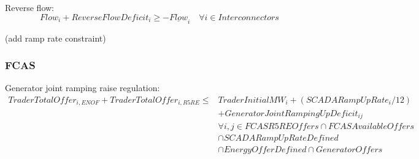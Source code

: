 \documentclass{article}
\begin{document}
Reverse flow:
\begin{equation}
Flow_{i} + ReverseFlowDeficit_{i} \geq - \underline{Flow}_{i} \quad \forall i \in Interconnectors
\end{equation}

(add ramp rate constraint)

\subsubsection{FCAS}
%
%
%
%
%

Generator joint ramping raise regulation:
\begin{equation}
\begin{split}
TraderTotalOffer_{i,ENOF} + TraderTotalOffer_{i,R5RE} \leq & TraderInitialMW_{i} + (SCADARampUpRate_{i} / 12)\\ 
& + GeneratorJointRampingUpDeficit_{ij} \\
& \forall i,j \in FCASR5REOffers \cap FCASAvailableOffers\\
& \cap SCADARampUpRateDefined\\
& \cap EnergyOfferDefined \cap GeneratorOffers\\
\end{split}
\end{equation}

%
%
%
%
%
\end{document}
